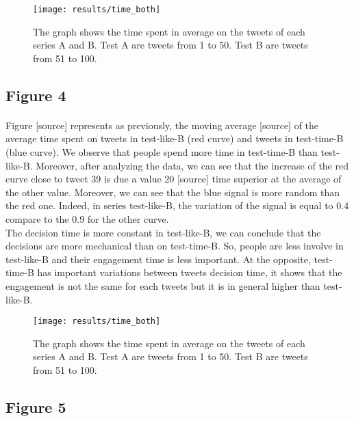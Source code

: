 \begin{figure}[h] 
\centering 
\texttt{[image: results/time\_both]} 
\caption[Average time on the 100 tweets]{The graph shows the time spent in average on the tweets of each series A and B. Test A are tweets from 1 to 50. Test B are tweets from 51 to 100.}
\label{fig:time_both} 
\end{figure}


\subsection{Figure 4}

\paragraph{}
Figure [source] represents as previously, the moving average [source] of the average time spent on tweets in test-like-B (red curve) and tweets in test-time-B (blue curve). We observe that people spend more time in test-time-B than test-like-B. Moreover, after analyzing the data, we can see that the increase of the red curve close to tweet 39 is due a value 20 [source] time superior at the average of the other value.
Moreover, we can see that the blue signal is more random than the red one. Indeed, in series test-like-B, the variation of the signal is equal to 0.4 compare to the 0.9 for the other curve.\\
The decision time is more constant in test-like-B, we can conclude that the decisions are more mechanical than on test-time-B. So,  people are less involve in test-like-B and their engagement time is less important. At the opposite, test-time-B has important variations between tweets decision time, it shows that the engagement is not the same for each tweets but it is in general higher than test-like-B.

\begin{figure}[h] 
\centering 
\texttt{[image: results/time\_both]} 
\caption[Average time on the 100 tweets]{The graph shows the time spent in average on the tweets of each series A and B. Test A are tweets from 1 to 50. Test B are tweets from 51 to 100.}
\label{fig:time_both} 
\end{figure}


\subsection{Figure 5}

